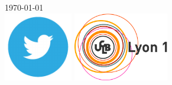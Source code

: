 \documentclass[12pt]{article}
\begin{document}
\begin{titlepage}


{\large \today}\\[1cm] %


\includegraphics[height=3cm]{twitter}\vspace{2cm}
\includegraphics[height=3cm]{ucbl}\\
 

\vfill %

\end{titlepage}
\end{document}
